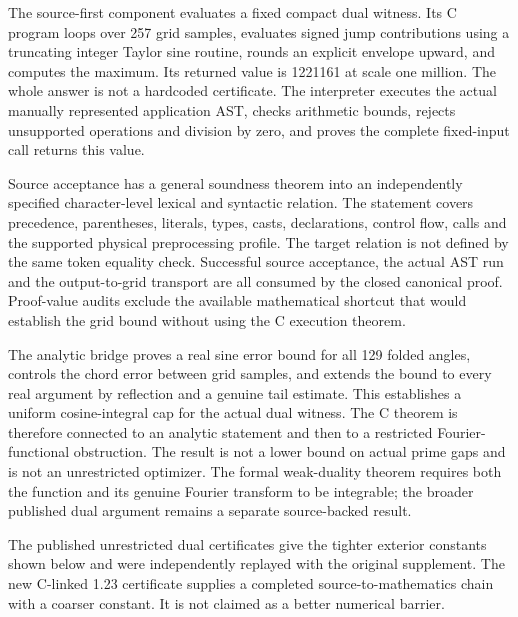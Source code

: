 \documentclass[11pt]{article}
\begin{document}
The source-first component evaluates a fixed compact dual witness. Its C program loops over 257 grid samples, evaluates signed jump contributions using a truncating integer Taylor sine routine, rounds an explicit envelope upward, and computes the maximum. Its returned value is 1221161 at scale one million. The whole answer is not a hardcoded certificate. The interpreter executes the actual manually represented application AST, checks arithmetic bounds, rejects unsupported operations and division by zero, and proves the complete fixed-input call returns this value.


Source acceptance has a general soundness theorem into an independently specified character-level lexical and syntactic relation. The statement covers precedence, parentheses, literals, types, casts, declarations, control flow, calls and the supported physical preprocessing profile. The target relation is not defined by the same token equality check. Successful source acceptance, the actual AST run and the output-to-grid transport are all consumed by the closed canonical proof. Proof-value audits exclude the available mathematical shortcut that would establish the grid bound without using the C execution theorem.


The analytic bridge proves a real sine error bound for all 129 folded angles, controls the chord error between grid samples, and extends the bound to every real argument by reflection and a genuine tail estimate. This establishes a uniform cosine-integral cap for the actual dual witness. The C theorem is therefore connected to an analytic statement and then to a restricted Fourier-functional obstruction. The result is not a lower bound on actual prime gaps and is not an unrestricted optimizer. The formal weak-duality theorem requires both the function and its genuine Fourier transform to be integrable; the broader published dual argument remains a separate source-backed result.


The published unrestricted dual certificates give the tighter exterior constants shown below and were independently replayed with the original supplement. The new C-linked 1.23 certificate supplies a completed source-to-mathematics chain with a coarser constant. It is not claimed as a better numerical barrier.


\begin{center}


\ifdim\wd\eqbox>\linewidth\resizebox{\linewidth}{!}{\usebox{\eqbox}}\else\usebox{\eqbox}\fi

\end{center}
\end{document}
